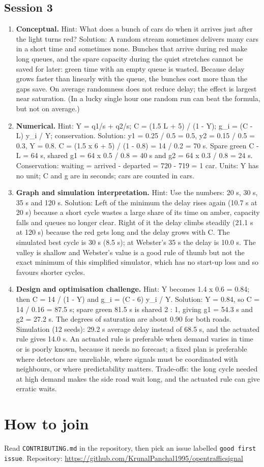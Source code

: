 \documentclass[11pt,a4paper]{article}
\begin{document}
\subsection*{Session 3}
\begin{enumerate}[nosep]
\item \textbf{Conceptual.} Hint: What does a bunch of cars do when it arrives just after the light turns red? Solution: A random stream sometimes delivers many cars in a short time and sometimes none. Bunches that arrive during red make long queues, and the spare capacity during the quiet stretches cannot be saved for later: green time with an empty queue is wasted. Because delay grows faster than linearly with the queue, the bunches cost more than the gaps save. On average randomness does not reduce delay; the effect is largest near saturation. (In a lucky single hour one random run can beat the formula, but not on average.)
\item \textbf{Numerical.} Hint: Y = q1/s + q2/s; C = (1.5 L + 5) / (1 - Y); g\_i = (C - L) y\_i / Y; conservation. Solution: y1 = 0.25 / 0.5 = 0.5, y2 = 0.15 / 0.5 = 0.3, Y = 0.8. C = (1.5 x 6 + 5) / (1 - 0.8) = 14 / 0.2 = 70 s. Spare green C - L = 64 s, shared g1 = 64 x 0.5 / 0.8 = 40 s and g2 = 64 x 0.3 / 0.8 = 24 s. Conservation: waiting = arrived - departed = 720 - 719 = 1 car. Units: Y has no unit; C and g are in seconds; cars are counted in cars.
\item \textbf{Graph and simulation interpretation.} Hint: Use the numbers: 20 s, 30 s, 35 s and 120 s. Solution: Left of the minimum the delay rises again (10.7 s at 20 s) because a short cycle wastes a large share of its time on amber, capacity falls and queues no longer clear. Right of it the delay climbs steadily (21.1 s at 120 s) because the red gets long and the delay grows with C. The simulated best cycle is 30 s (8.5 s); at Webster's 35 s the delay is 10.0 s. The valley is shallow and Webster's value is a good rule of thumb but not the exact minimum of this simplified simulator, which has no start-up loss and so favours shorter cycles.
\item \textbf{Design and optimisation challenge.} Hint: Y becomes 1.4 x 0.6 = 0.84; then C = 14 / (1 - Y) and g\_i = (C - 6) y\_i / Y. Solution: Y = 0.84, so C = 14 / 0.16 = 87.5 s; spare green 81.5 s is shared 2 : 1, giving g1 = 54.3 s and g2 = 27.2 s. The degrees of saturation are about 0.90 for both roads. Simulation (12 seeds): 29.2 s average delay instead of 68.5 s, and the actuated rule gives 14.0 s. An actuated rule is preferable when demand varies in time or is poorly known, because it needs no forecast; a fixed plan is preferable where detectors are unreliable, where signals must be coordinated with neighbours, or where predictability matters. Trade-offs: the long cycle needed at high demand makes the side road wait long, and the actuated rule can give erratic waits.
\end{enumerate}

\section{How to join}
Read \texttt{CONTRIBUTING.md} in the repository, then pick an issue labelled \texttt{good first issue}. Repository: \url{https://github.com/KrunalPanchal1995/opentrafficsignal}
\end{document}
